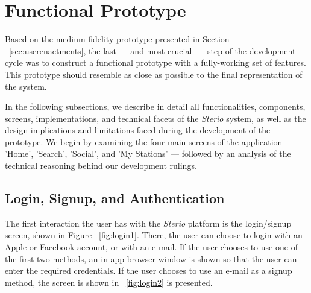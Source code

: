 
\section{Functional Prototype}

Based on the medium-fidelity prototype presented in Section ~\ref{sec:userenactments}, the last — and most crucial — step of the development cycle was to construct a functional prototype with a fully-working set of features. This prototype should resemble as close as possible to the final representation of the system. 

In the following subsections, we describe in detail all functionalities, components, screens, implementations, and technical facets of the \textit{Sterio} system, as well as the design implications and limitations faced during the development of the prototype. We begin by examining the four main screens of the application — 'Home', 'Search', 'Social', and 'My Stations' — followed by an analysis of the technical reasoning behind our development rulings.

\newpage
\subsection{Login, Signup, and Authentication}
\label{subsec:lsa}

The first interaction the user has with the \textit{Sterio} platform is the login/signup screen, shown in Figure ~\ref{fig:login1}. There, the user can choose to login with an Apple or Facebook account, or with an e-mail. If the user chooses to use one of the first two methods, an in-app browser window is shown so that the user can enter the required credentials. If the user chooses to use an e-mail as a signup method, the screen is shown in ~\ref{fig:login2} is presented.

